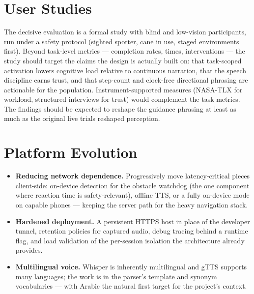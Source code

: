 \section{User Studies}
\label{sec:fw_studies}

The decisive evaluation is a formal study with blind and low-vision participants,
run under a safety protocol (sighted spotter, cane in use, staged environments
first). Beyond task-level metrics --- completion rates, times, interventions ---
the study should target the claims the design is actually built on: that
task-scoped activation lowers cognitive load relative to continuous narration,
that the speech discipline earns trust, and that step-count and clock-free
directional phrasing are actionable for the population. Instrument-supported
measures (NASA-TLX for workload, structured interviews for trust) would
complement the task metrics. The findings should be expected to reshape the
guidance phrasing at least as much as the original live trials reshaped
perception.

\section{Platform Evolution}
\label{sec:fw_platform}

\begin{itemize}[nosep]
  \item \textbf{Reducing network dependence.} Progressively move latency-critical
        pieces client-side: on-device detection for the obstacle watchdog (the
        one component where reaction time is safety-relevant), offline TTS, or a
        fully on-device mode on capable phones --- keeping the server path for
        the heavy navigation stack.
  \item \textbf{Hardened deployment.} A persistent HTTPS host in place of the
        developer tunnel, retention policies for captured audio, debug tracing
        behind a runtime flag, and load validation of the per-session isolation
        the architecture already provides.
  \item \textbf{Multilingual voice.} Whisper is inherently multilingual and gTTS
        supports many languages; the work is in the parser's template and
        synonym vocabularies --- with Arabic the natural first target for the
        project's context.
\end{itemize}